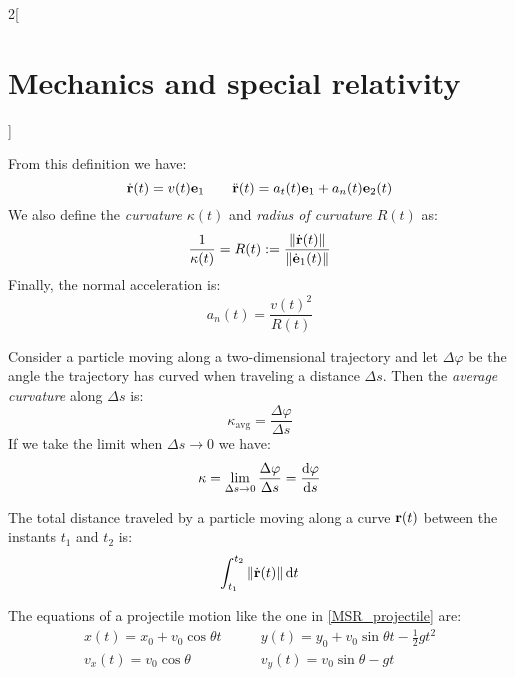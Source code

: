 \documentclass[../../../main_physics.tex]{subfiles}
\begin{document}
\begin{multicols}{2}[\section{Mechanics and special relativity}]
\begin{definition}
    From this definition we have: $$\dot{\boldsymbol{\mathrm{r}}}(t)=v(t)\boldsymbol{\mathrm{e}}_1\qquad\ddot{\boldsymbol{\mathrm{r}}}(t)=a_t(t)\boldsymbol{\mathrm{e}}_1+a_n(t)\boldsymbol{\mathrm{e}}_2(t)$$ We also define the \emph{curvature} $\kappa(t)$ and \emph{radius of curvature} $R(t)$ as: $$\frac{1}{\kappa(t)}=R(t):=\frac{\|\dot{\boldsymbol{\mathrm{r}}}(t)\|}{\|\dot{\boldsymbol{\mathrm{e}}}_1(t)\|}$$ Finally, the normal acceleration is: $$a_n(t)=\frac{v(t)^2}{R(t)}$$
  \end{definition}
  \begin{proposition}[Curvature]
    Consider a particle moving along a two-dimensional trajectory and let $\Delta\varphi$ be the angle the trajectory has curved when traveling a distance $\Delta s$. Then the \emph{average curvature} along $\Delta s$ is: $$\kappa_\text{avg}=\frac{\Delta \varphi}{\Delta s}$$ If we take the limit when $\Delta s\to 0$ we have: $$\kappa=\lim_{\Delta s\to 0}\frac{\Delta \varphi}{\Delta s}=\dv{\varphi}{s}$$
  \end{proposition}
  \begin{proposition}
    The total distance traveled by a particle moving along a curve $\boldsymbol{\mathrm{r}}(t)$ between the instants $t_1$ and $t_2$ is: $$\int_{t_1}^{t_2}\|\dot{\boldsymbol{\mathrm{r}}}(t)\|\dd{t}$$
  \end{proposition}
  \begin{proposition}
    The equations of a projectile motion like the one in \cref{MSR_projectile} are:
    \begin{align*}
      x(t)=x_0+v_0\cos\theta t\quad & \quad y(t)=y_0+v_0\sin\theta t-\frac{1}{2}gt^2 \\
      v_x(t)=v_0\cos\theta\quad     & \quad v_y(t)=v_0\sin\theta-gt
    \end{align*}
    \begin{center}
      \begin{minipage}{\linewidth}
        \centering
        
        \label{MSR_projectile}
      \end{minipage}
    \end{center}
  \end{proposition}

\end{multicols}
\end{document}
